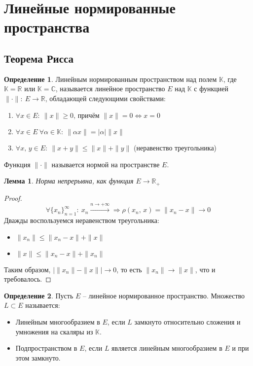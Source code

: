 \documentclass[a4paper,12pt]{article}
\renewcommand{\leq}{\ensuremath{\leqslant}}
\renewcommand{\geq}{\ensuremath{\geqslant}}
\theoremstyle{plain}
\newtheorem{lemma}{Лемма}[section]
\theoremstyle{definition}
\newtheorem{definition}{Определение}[section]
\theoremstyle{remark}
\begin{document}
\section{Линейные нормированные пространства}
\subsection{Теорема Рисса}
\begin{definition}
	Линейным нормированным пространством над полем $\mathbb{K}$, где $\mathbb{K} = \mathbb{R}$ или $\mathbb{K} = \mathbb{C}$, называется линейное пространство $E$ над $\mathbb{K}$ с функцией $\|\cdot\| :\: E \to \mathbb{R}$, обладающей следующими свойствами:
	\begin{enumerate}
		\item $\forall x \in E :\: \|x\| \geq 0$, причём $\|x\| = 0 \Leftrightarrow x = 0$
		\item $\forall x \in E \: \forall \alpha \in \mathbb{K} :\: \|\alpha x\| = \vert\alpha\vert\|x\|$
		\item $\forall x,\,y \in E :\: \|x + y\| \leq \|x\| + \|y\|$ (неравенство треугольника)
	\end{enumerate}
	Функция $\|\cdot\|$ называется нормой на пространстве $E$.
\end{definition}

\begin{lemma}\label{NormCont}
	Норма непрерывна, как функция $E \to \mathbb{R}_+$
\end{lemma}

\begin{proof}
	\[
		\forall \{x_n\}_{n=1}^\infty :\: x_n \overset{n \to +\infty}{\to} \Rightarrow \rho(x_n,\, x) = \|x_n - x\| \to 0
	\]
	Дважды воспользуемся неравенством треугольника:
	\begin{itemize}
		\item $\|x_n\| \leq \|x_n - x\| + \|x\|$
		\item $\|x\| \leq \|x_n - x\| + \|x_n\|$
	\end{itemize}
	Таким образом, $\vert\|x_n\| - \|x\|\vert \to 0$, то есть $\|x_n\| \to \|x\|$, что и требовалось.
\end{proof}

\begin{definition}
	Пусть $E$ -- линейное нормированное пространство. Множество $L \subset E$ называется:
	\begin{itemize}
		\item Линейным многообразием в $E$, если $L$ замкнуто относительно сложения и умножения на скаляры из $\mathbb{K}$.
		\item Подпространством в $E$, если $L$ является линейным многообразием в $E$ и при этом замкнуто.
	\end{itemize}
\end{definition}
\end{document}
